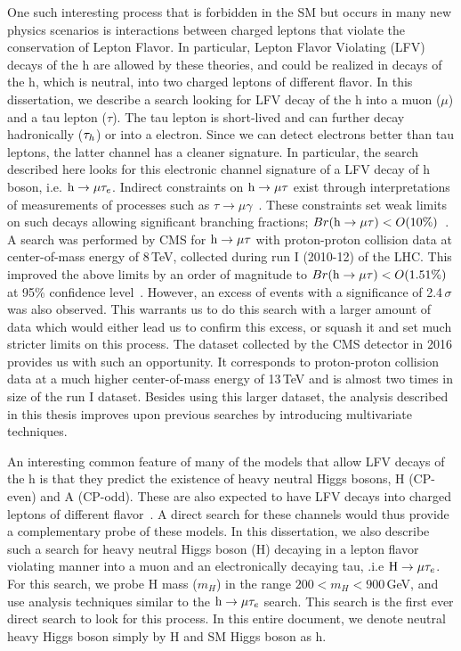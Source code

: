 One such interesting process that is forbidden in the SM but occurs in many new physics scenarios is interactions between charged leptons that violate the conservation of Lepton Flavor. In particular, Lepton Flavor Violating (LFV) decays of the h are allowed by these theories, and could be realized in decays of the h, which is neutral, into two charged leptons of different flavor. In this dissertation, we describe a search looking for LFV decay of the h into a muon ($\mu$) and a tau lepton ($\tau$). The tau lepton is short-lived and can further decay hadronically ($\tau_{h}$) or into a electron. Since we can detect electrons better than tau leptons, the latter channel has a cleaner signature. In particular, the search described here looks for this electronic channel signature of a LFV decay of h boson, i.e. $\text{h} \to \mu \tau_{e}$. Indirect constraints on $\text{h} \to \mu \tau$ exist through interpretations of measurements of processes such as $\tau \rightarrow \mu \gamma$~\cite{kanemura}. These constraints set weak limits on such decays allowing significant branching fractions; $Br(\text{h} \to \mu \tau)<O(10\%)$~\cite{Blankenburg:2012ex,Harnik:2012pb}. A search was performed by CMS for $\text{h} \to \mu \tau$ with proton-proton collision data at center-of-mass energy of 8\,TeV, collected during run I (2010-12) of the LHC. This improved the above limits by an order of magnitude to $Br(\text{h} \to \mu \tau)<O(1.51\%)$ at 95\% confidence level~\cite{Khachatryan:2015kon}. However, an excess of events with a significance of 2.4\,$\sigma$ was also observed. This warrants us to do this search with a larger amount of data which would either lead us to confirm this excess, or squash it and set much stricter limits on this process. The dataset collected by the CMS detector in 2016 provides us with such an opportunity. It corresponds to proton-proton collision data at a much higher center-of-mass energy of 13\,TeV and is almost two times in size of the run I dataset. Besides using this larger dataset, the analysis described in this thesis improves upon previous searches by introducing multivariate techniques.

An interesting common feature of many of the models that allow LFV decays of the h is that they predict the existence of heavy neutral Higgs bosons, H (CP-even) and A (CP-odd). These are also expected to have LFV decays into charged leptons of different flavor~\cite{PhysRevD.93.055021}. A direct search for these channels would thus provide a complementary probe of these models. In this dissertation, we also describe such a search for heavy neutral Higgs boson (H) decaying in a lepton flavor violating manner into a muon and an electronically decaying tau, .i.e $\text{H} \to \mu \tau_{e}$. For this search, we probe H mass ($m_H$) in the range $200<m_H<900$\,GeV, and use analysis techniques similar to the $\text{h} \to \mu \tau_{e}$ search. This search is the first ever direct search to look for this process. In this entire document, we denote neutral heavy Higgs boson simply by H and SM Higgs boson as h.

